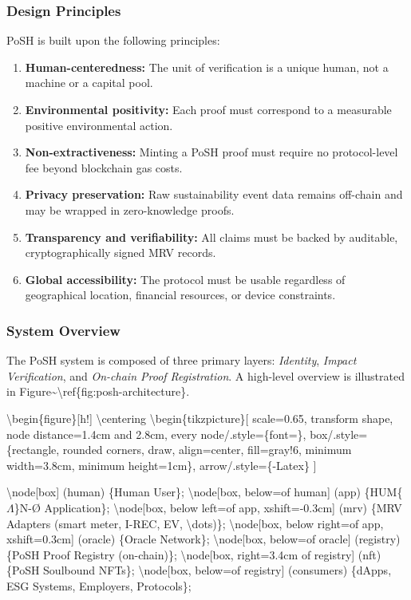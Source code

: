 \documentclass{article}
\begin{document}
\subsubsection{Design Principles}

PoSH is built upon the following principles:

\begin{enumerate}
\item \textbf{Human-centeredness:} The unit of verification is a unique human,
not a machine or a capital pool.
\item \textbf{Environmental positivity:} Each proof must correspond to a
measurable positive environmental action.
\item \textbf{Non-extractiveness:} Minting a PoSH proof must require no
protocol-level fee beyond blockchain gas costs.
\item \textbf{Privacy preservation:} Raw sustainability event data remains
off-chain and may be wrapped in zero-knowledge proofs.
\item \textbf{Transparency and verifiability:} All claims must be backed by
auditable, cryptographically signed MRV records.
\item \textbf{Global accessibility:} The protocol must be usable regardless
of geographical location, financial resources, or device constraints.
\end{enumerate}

\subsubsection{System Overview}

The PoSH system is composed of three primary layers:
\textit{Identity}, \textit{Impact Verification}, and \textit{On-chain Proof
Registration}. A high-level overview is illustrated in
Figure{\textasciitilde}{\textbackslash}ref\{fig:posh-architecture\}.

{\textbackslash}begin\{figure\}[h!]
{\textbackslash}centering
{\textbackslash}begin\{tikzpicture\}[
scale=0.65,
transform shape,
node distance=1.4cm and 2.8cm,
every node/.style=\{font=\},
box/.style=\{rectangle, rounded corners, draw, align=center, fill=gray!6, minimum width=3.8cm, minimum height=1cm\},
arrow/.style=\{-Latex\}
]

{\textbackslash}node[box] (human) \{Human User\};
{\textbackslash}node[box, below=of human] (app) \{HUM\{$\Lambda$\}N-Ø
Application\};
{\textbackslash}node[box, below left=of app, xshift=-0.3cm] (mrv) \{MRV Adapters
(smart meter, I-REC, EV, {\textbackslash}dots)\};
{\textbackslash}node[box, below right=of app, xshift=0.3cm] (oracle) \{Oracle Network\};
{\textbackslash}node[box, below=of oracle] (registry) \{PoSH Proof Registry
(on-chain)\};
{\textbackslash}node[box, right=3.4cm of registry] (nft) \{PoSH Soulbound
NFTs\};
{\textbackslash}node[box, below=of registry] (consumers) \{dApps, ESG Systems,
Employers, Protocols\};
\end{document}
